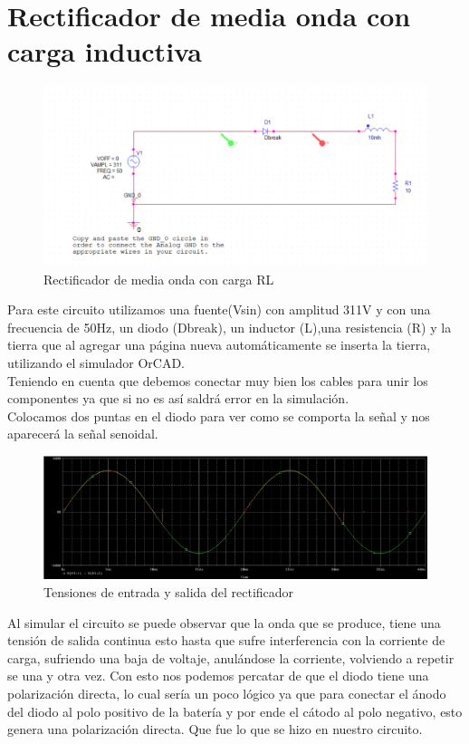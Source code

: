 \documentclass[12pt,a4paper]{article}
\begin{document}
\section{Rectificador de media onda con carga inductiva}
\begin{figure}[hbtp]
\includegraphics[scale=0.5]{1.png}
\caption{Rectificador de media onda con carga RL}
\end{figure}
Para este circuito utilizamos una fuente(Vsin) con amplitud 311V y con una frecuencia de 50Hz, un diodo (Dbreak), un inductor (L),una resistencia  (R) y la tierra que al agregar una página nueva automáticamente se inserta la tierra, utilizando el simulador OrCAD. \\
Teniendo en cuenta que debemos conectar muy bien los cables para unir los componentes ya que si no es así saldrá error en la simulación.\\
Colocamos dos puntas en el diodo para ver como se comporta la señal y nos aparecerá la señal senoidal.

\begin{figure}[hbtp]
\includegraphics[scale=0.35]{2.png}
\caption{Tensiones de entrada y salida del rectificador}
\end{figure}
Al simular el circuito se puede observar que la onda que se produce, tiene una tensión de salida continua esto hasta que sufre interferencia con la corriente de carga, sufriendo una baja de voltaje, anulándose la corriente, volviendo a repetir se una y otra vez.
Con esto nos podemos percatar de que el diodo tiene una polarización directa, lo cual sería un poco lógico ya que para conectar el ánodo del diodo al polo positivo de la batería y por ende el cátodo al polo negativo, esto genera una polarización directa. Que fue lo que se hizo en nuestro circuito. 
\end{document}
